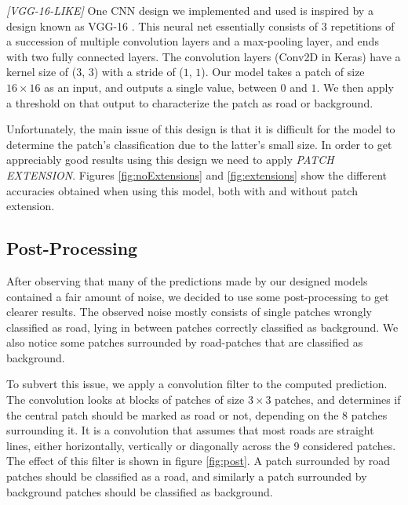 \documentclass[10pt,conference,compsocconf]{IEEEtran}
\begin{document}
\smallskip
\textit{[VGG-16-LIKE]}
One CNN design we implemented and used is inspired by a design known as VGG-16 \cite{vgg}. This neural net essentially consists of 3 repetitions of a succession of multiple convolution layers and a max-pooling layer, and ends with two fully connected layers. The convolution layers (Conv2D in Keras) have a kernel size of ($3$, $3$) with a stride of ($1$, $1$). Our model takes a patch of size $16 \times 16$ as an input, and outputs a single value, between $0$ and $1$. We then apply a threshold on that output to characterize the patch as road or background.

Unfortunately, the main issue of this design is that it is difficult for the model to determine the patch's classification due to the latter's small size. In order to get appreciably good results using this design we need to apply \textit{PATCH EXTENSION}. Figures \ref{fig:noExtensions} and \ref{fig:extensions} show the different accuracies obtained when using this model, both with and without patch extension.


\subsection{Post-Processing} 
\label{ssec:post}

After observing that many of the predictions made by our designed models contained a fair amount of noise, we decided to use some post-processing to get clearer results. The observed noise mostly consists of single patches wrongly classified as road, lying in between patches correctly classified as background. We also notice some patches surrounded by road-patches that are classified as background.

To subvert this issue, we apply a convolution filter to the computed prediction. The convolution looks at blocks of patches of size $3 \times 3$ patches, and determines if the central patch should be marked as road or not, depending on the $8$ patches surrounding it. It is a convolution that assumes that most roads are straight lines, either horizontally, vertically or diagonally across the 9 considered patches. The effect of this filter is shown in figure \ref{fig:post}. A patch surrounded by road patches should be classified as a road, and similarly a patch surrounded by background patches should be classified as background.
\end{document}
